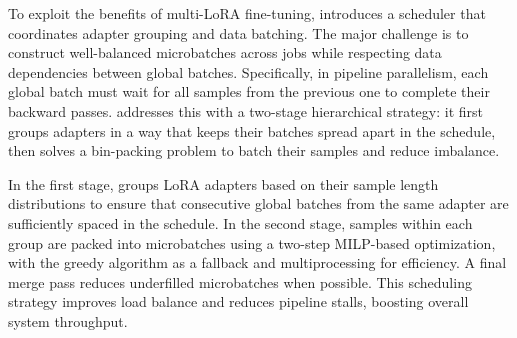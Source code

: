 To exploit the benefits of multi-LoRA fine-tuning, \Name introduces a scheduler that coordinates adapter grouping and data batching.
The major challenge is to construct well-balanced microbatches across jobs while respecting data dependencies between global batches. Specifically, in pipeline parallelism, each global batch must wait for all samples from the previous one to complete their backward passes.
\Name addresses this with a two-stage hierarchical strategy: it first groups adapters in a way that keeps their batches spread apart in the schedule, then solves a bin-packing problem to batch their samples and reduce imbalance.

In the first stage, \Name groups LoRA adapters based on their sample length distributions to ensure that consecutive global batches from the same adapter are sufficiently spaced in the schedule.
In the second stage, samples within each group are packed into microbatches using a two-step MILP-based optimization, with the greedy algorithm as a fallback and multiprocessing for efficiency.
A final merge pass reduces underfilled microbatches when possible.
This scheduling strategy improves load balance and reduces pipeline stalls, boosting overall system throughput.






